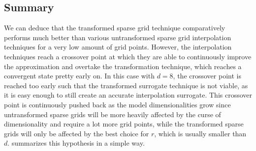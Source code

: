 \documentclass[
  a4paper,  %
  twoside,  %
  bibliography=totoc,
  headsepline,
  cleardoublepage=empty,
  parskip=half,
  draft=false
]{scrbook}
\begin{document}
\subsection{Summary}
We can deduce that the transformed sparse grid technique comparatively performs much better than various untransformed sparse grid interpolation techniques for a very low amount of grid points.
However, the interpolation techniques reach a crossover point at which they are able to continuously improve the approximation and overtake the transformation technique, which reaches a convergent state pretty early on.
In this case with $d=8$, the crossover point is reached too early such that the transformed surrogate technique is not viable, as it is easy enough to still create an accurate interpolation surrogate.
This crossover point is continuously pushed back as the model dimensionalities grow since untransformed sparse grids will be more heavily affected by the curse of dimensionality and require a lot more grid points, while the transformed sparse grids will only be affected by the best choice for $r$, which is usually smaller than $d$.
 summarizes this hypothesis in a simple way.
\end{document}

